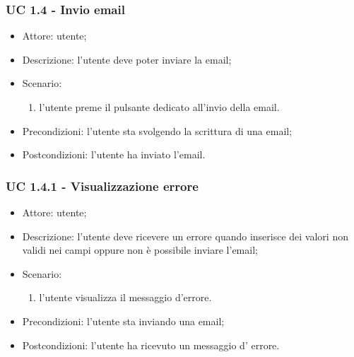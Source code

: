     \subsubsection{UC 1.4 - Invio email} \label{sec: UC 1.4}
    \begin{itemize}
        \item Attore: utente;
        \item Descrizione: l'utente deve poter inviare la email;
        \item Scenario:
        \begin{enumerate}
        \item l'utente preme il pulsante dedicato all'invio della email.
        \end{enumerate}
        \item Precondizioni: l'utente sta svolgendo la scrittura di una email;
        \item Postcondizioni: l'utente ha inviato l'email.
    \end{itemize}

    \subsubsection{UC 1.4.1 - Visualizzazione errore} \label{sec: UC 1.4.1}
    \begin{itemize}
        \item Attore: utente;
        \item Descrizione: l'utente deve ricevere un errore quando inserisce dei valori non validi nei campi oppure non è possibile inviare l'email;
        \item Scenario:
        \begin{enumerate}
        \item l'utente visualizza il messaggio d'errore.
        \end{enumerate}  
        \item Precondizioni: l'utente sta inviando una email;
        \item Postcondizioni: l'utente ha ricevuto un messaggio d' errore.
    \end{itemize}

